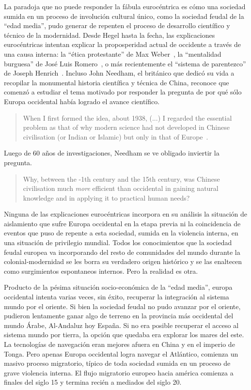 \documentclass[a4paper,10pt]{book}
\theoremstyle{definition}
\begin{document}
La paradoja que no puede responder la fábula eurocéntrica es cómo una sociedad sumida en un proceso de involución cultural único, como la sociedad feudal de la ``edad media'', pudo generar de repenten el proceso de desarrollo científico y técnico de la modernidad.
Desde Hegel hasta la fecha, las explicaciones eurocéntricas intentan explicar la proposperidad actual de occidente a través de una causa interna: la ``ética protestante'' de Max Weber~\cite{weber1905-eticaProtestante}, la ``mentalidad burguesa'' de José Luis Romero~\cite{romero1967-revolucionBurguesa}, o más recientemente el ``sistema de parentezco'' de Joseph Henrich~\cite{henrich2020-weirdest}.
Incluso John Needham, el británico que dedicó su vida a recopilar la monumental historia científica y técnica de China, reconoce que comenzó a estudiar el tema motivado por responder la pregunta de por qué sólo Europa occidental había logrado el avance científico.
\begin{quotation}
When I first formed the idea, about 1938, (...) I regarded the essential problem as that of why modern science had not developed in Chinese civilisation (or Indian or Islamic) but only in that of Europe~\cite{needham2004-generalConclusionsAndReflections}.%
\end{quotation}
Luego de 60 años de investigaciones, Needham se ve obligado inviertir la pregunta.
\begin{quotation}
Why, between the -1th century and the 15th century, was Chinese civilisation much \emph{more} efficient than occidental in gaining natural knowledge and in applying it to practical human needs?~\cite{needham2004-generalConclusionsAndReflections}
\end{quotation}


Ninguna de las explicaciones eurocéntricas incorpora en su análisis la situación de aislamiento que sufre Europa occidental en la etapa previa ni la coincidencia de eventos que puso de repente a esta sociedad, sumida en la violencia interna, en una situación de privilegio mundial.
Todos los conocimientos que la sociedad feudal europea va incorporando del resto de comunidades del mundo durante la colonial-modernidad se les borra su verdadero origen histórico y se las enaltecen como surgimientos espontaneos internos.
Pero la realidad es otra.


Producto de la pésima situación socio-económica de la ``edad media'', europa occidental intenta varias veces, sin éxito, recuperar la integración al sistema mundo por el oriente.
Si bien la sociedad feudal no pudo avanzar por el oriente, pudieron lentamente ganar algo de terreno en la provincia más occidental del mundo Árabe, Al-Andaluz hoy España.
Si no era posible recuperar el acceso al sistema mundo por tierra, la opción que quedaba era explorar los mares del este.
La tecnologías de navegación eran mejores afuera en China y en el imperio de Tonga.
Pero apenas Europa occidental logra navegar el Atlántico, comienza un masivo proceso migratorio, típico de toda sociedad sumida en un proceso de grave violencia interna.
El flujo migratorio europeo hacia américa comienza a finales del siglo 15 y termina recién a mediados del siglo 20.
\end{document}
